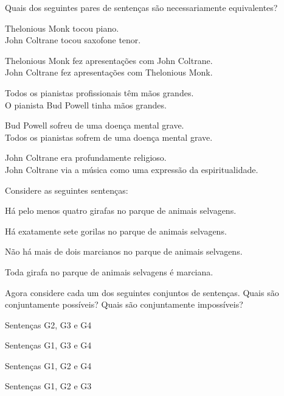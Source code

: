 \problempart Quais dos seguintes pares de sentenças são necessariamente equivalentes? 

\begin{compactlist}
\item Thelonious Monk tocou piano.	\\
	John Coltrane tocou saxofone tenor.
\item Thelonious Monk fez apresentações com John Coltrane.	\\
	John Coltrane fez apresentações com Thelonious Monk.
\item Todos os pianistas profissionais têm mãos grandes.	\\
	O pianista Bud Powell tinha mãos grandes.
\item Bud Powell sofreu de uma doença mental grave.	 \\
	Todos os pianistas sofrem de uma doença mental grave.
\item John Coltrane era profundamente religioso.	 \\
John Coltrane via a música como uma expressão da espiritualidade.
\end{compactlist}

\noindent
\problempart 
\label{pr.MartianGiraffes}
Considere as seguintes sentenças: 
\begin{compactlist}%
\item[G1.] \label{itm:at_least_four}Há pelo menos quatro girafas no parque de animais selvagens.
\item[G2.] \label{itm:exactly_seven} Há exatamente sete gorilas no parque de animais selvagens.
\item[G3.] \label{itm:not_more_than_two} Não há mais de dois marcianos no parque de animais selvagens.
\item[G4.] \label{itm:martians} Toda girafa no parque de animais selvagens é marciana.
\end{compactlist}

Agora considere cada um dos seguintes conjuntos de sentenças. Quais são conjuntamente possíveis? Quais são conjuntamente impossíveis?
\begin{compactlist}
\item Sentenças G2, G3 e G4
\hfill {}
\item Sentenças G1, G3 e G4
\hfill {}
\item Sentenças G1, G2 e G4
\hfill {}
\item Sentenças G1, G2 e G3
\hfill {}
\end{compactlist}

